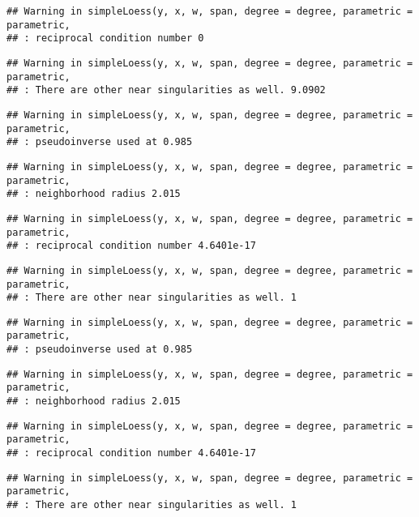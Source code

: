 \documentclass[
]{article}
\begin{document}
\begin{verbatim}
## Warning in simpleLoess(y, x, w, span, degree = degree, parametric = parametric,
## : reciprocal condition number 0
\end{verbatim}

\begin{verbatim}
## Warning in simpleLoess(y, x, w, span, degree = degree, parametric = parametric,
## : There are other near singularities as well. 9.0902
\end{verbatim}

\begin{verbatim}
## Warning in simpleLoess(y, x, w, span, degree = degree, parametric = parametric,
## : pseudoinverse used at 0.985
\end{verbatim}

\begin{verbatim}
## Warning in simpleLoess(y, x, w, span, degree = degree, parametric = parametric,
## : neighborhood radius 2.015
\end{verbatim}

\begin{verbatim}
## Warning in simpleLoess(y, x, w, span, degree = degree, parametric = parametric,
## : reciprocal condition number 4.6401e-17
\end{verbatim}

\begin{verbatim}
## Warning in simpleLoess(y, x, w, span, degree = degree, parametric = parametric,
## : There are other near singularities as well. 1
\end{verbatim}

\begin{verbatim}
## Warning in simpleLoess(y, x, w, span, degree = degree, parametric = parametric,
## : pseudoinverse used at 0.985
\end{verbatim}

\begin{verbatim}
## Warning in simpleLoess(y, x, w, span, degree = degree, parametric = parametric,
## : neighborhood radius 2.015
\end{verbatim}

\begin{verbatim}
## Warning in simpleLoess(y, x, w, span, degree = degree, parametric = parametric,
## : reciprocal condition number 4.6401e-17
\end{verbatim}

\begin{verbatim}
## Warning in simpleLoess(y, x, w, span, degree = degree, parametric = parametric,
## : There are other near singularities as well. 1
\end{verbatim}
\end{document}
